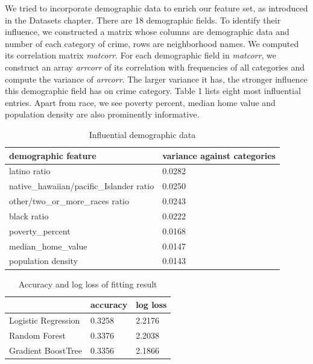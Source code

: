 \documentclass[11pt,conference]{IEEEtran}
\begin{document}
We tried to incorporate demographic data to enrich our feature set, as introduced in the Datasets chapter. There are 18 demographic fields. To identify their influence, we constructed a matrix whose columns are demographic data and number of each category of crime, rows are neighborhood names. We computed its correlation matrix \textit{matcorr}. For each demographic field in \textit{matcorr}, we construct an array \textit{arrcorr} of its correlation with frequencies of all categories and compute the variance of \textit{arrcorr}. The larger variance it has, the stronger influence this demographic field has on crime category. Table 1 lists eight most influential  entries. Apart from race, we see poverty percent, median home value and population density are also prominently informative.
\begin{table}[h]
\centering
\caption{Influential demographic data}
\label{my-label}
\begin{tabular}{|l|l|}
\hline
demographic feature                      & variance against categories \\ \hline
latino ratio                             & 0.0282   \\ \hline
native\_hawaiian/pacific\_Islander ratio & 0.0250   \\ \hline
other/two\_or\_more\_races ratio         & 0.0243   \\ \hline
black ratio                                    & 0.0222   \\ \hline
poverty\_percent                         & 0.0168   \\ \hline
median\_home\_value                      & 0.0147   \\ \hline
population density                                  & 0.0143   \\ \hline
\end{tabular}
\end{table}

\begin{table}[h]
\centering
\caption{Accuracy and log loss of fitting result}
\label{my-label}
\begin{tabular}{|l|l|l|}
\hline
                    & accuracy & log loss \\ \hline
Logistic Regression & 0.3258        & 2.2176   \\ \hline
Random Forest       & 0.3376        & 2.2038   \\ \hline
Gradient BoostTree  & 0.3356        & 2.1866   \\ \hline
\end{tabular}
\end{table}
\end{document}
